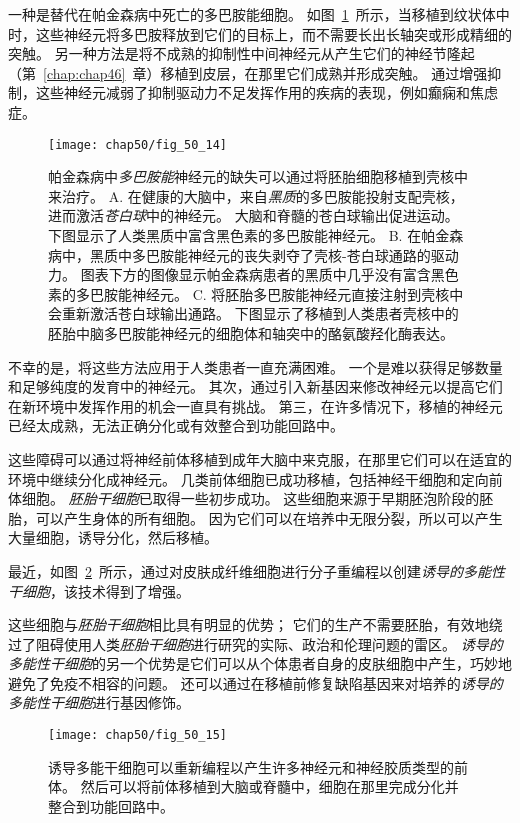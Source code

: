 一种是替代在帕金森病中死亡的多巴胺能细胞。
如图~\ref{fig:50_14}~所示，当移植到纹状体中时，这些神经元将多巴胺释放到它们的目标上，而不需要长出长轴突或形成精细的突触。
另一种方法是将不成熟的抑制性中间神经元从产生它们的神经节隆起（第~\ref{chap:chap46}~章）移植到皮层，在那里它们成熟并形成突触。
通过增强抑制，这些神经元减弱了抑制驱动力不足发挥作用的疾病的表现，例如癫痫和焦虑症。


\begin{figure}[htbp]
	\centering
	\texttt{[image: chap50/fig\_50\_14]}
	\caption{帕金森病中\textit{多巴胺能}神经元的缺失可以通过将胚胎细胞移植到壳核中来治疗。
		A. 在健康的大脑中，来自\textit{黑质}的多巴胺能投射支配壳核，进而激活\textit{苍白球}中的神经元。
		大脑和脊髓的苍白球输出促进运动。
		下图显示了人类黑质中富含黑色素的多巴胺能神经元。
		B. 在帕金森病中，黑质中多巴胺能神经元的丧失剥夺了壳核-苍白球通路的驱动力。
		图表下方的图像显示帕金森病患者的黑质中几乎没有富含黑色素的多巴胺能神经元。
		C. 将胚胎多巴胺能神经元直接注射到壳核中会重新激活苍白球输出通路。
		下图显示了移植到人类患者壳核中的胚胎中脑多巴胺能神经元的细胞体和轴突中的酪氨酸羟化酶表达\cite{kordower2000neuropathology}。}
	\label{fig:50_14}
\end{figure}


不幸的是，将这些方法应用于人类患者一直充满困难。
一个是难以获得足够数量和足够纯度的发育中的神经元。
其次，通过引入新基因来修改神经元以提高它们在新环境中发挥作用的机会一直具有挑战。
第三，在许多情况下，移植的神经元已经太成熟，无法正确分化或有效整合到功能回路中。


这些障碍可以通过将神经前体移植到成年大脑中来克服，在那里它们可以在适宜的环境中继续分化成神经元。
几类前体细胞已成功移植，包括神经干细胞和定向前体细胞。
\textit{胚胎干细胞}已取得一些初步成功。
这些细胞来源于早期胚泡阶段的胚胎，可以产生身体的所有细胞。
因为它们可以在培养中无限分裂，所以可以产生大量细胞，诱导分化，然后移植。


最近，如图~\ref{fig:50_15}~所示，通过对皮肤成纤维细胞进行分子重编程以创建\textit{诱导的多能性干细胞}，该技术得到了增强。

这些细胞与\textit{胚胎干细胞}相比具有明显的优势；
它们的生产不需要胚胎，有效地绕过了阻碍使用人类\textit{胚胎干细胞}进行研究的实际、政治和伦理问题的雷区。
\textit{诱导的多能性干细胞}的另一个优势是它们可以从个体患者自身的皮肤细胞中产生，巧妙地避免了免疫不相容的问题。
还可以通过在移植前修复缺陷基因来对培养的\textit{诱导的多能性干细胞}进行基因修饰。


\begin{figure}[htbp]
	\centering
	\texttt{[image: chap50/fig\_50\_15]}
	\caption{诱导多能干细胞可以重新编程以产生许多神经元和神经胶质类型的前体。
		然后可以将前体移植到大脑或脊髓中，细胞在那里完成分化并整合到功能回路中\cite{wen2016modeling}。}
	\label{fig:50_15}
\end{figure}


